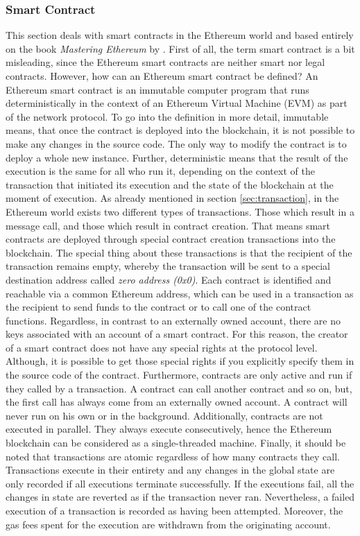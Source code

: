 \subsubsection{Smart Contract}
\label{sec:smart_contract}
This section deals with smart contracts in the Ethereum world and based 
entirely on the book \textit{Mastering Ethereum} by .
First of all, the term smart contract is a bit misleading, since the Ethereum smart contracts 
are neither smart nor legal contracts. However, how can an Ethereum smart contract be defined?
An Ethereum smart contract is an immutable computer program that runs deterministically in the context of an
Ethereum Virtual Machine (EVM) as part of the network protocol. To go into the definition in more detail, 
immutable means, that once the contract is deployed into the blockchain, it is not possible to make any
changes in the source code. The only way to modify the contract is to deploy a whole new instance. 
Further, deterministic means that the result of the execution is the same for all who run it, 
depending on the context of the transaction that initiated its execution and the state of the blockchain
at the moment of execution.
As already mentioned in section \ref{sec:transaction}, in the Ethereum world exists two different types of transactions.
Those which result in a message call, and those which result in contract creation. 
That means smart contracts are deployed through special contract creation transactions into the blockchain. 
The special thing about these transactions is that the recipient of the transaction remains empty, whereby the transaction
will be sent to a special destination address called \textit{zero address (0x0)}. Each contract is identified and reachable via
a common Ethereum address, which can be used in a transaction as the recipient to send funds to the contract or to call 
one of the contract functions. Regardless, in contrast to an externally owned account, there are no keys associated with 
an account of a smart contract. For this reason, the creator of a smart contract does not have any special rights at the 
protocol level. Although, it is possible to get those special rights if you explicitly 
specify them in the source code of the contract.
Furthermore, contracts are only active and run if they called by a transaction. 
A contract can call another contract and so on, but, 
the first call has always come from an externally owned account. 
A contract will never run on his own or in the background. Additionally, contracts are not executed in parallel.
They always execute consecutively, hence the Ethereum blockchain can be considered as a single-threaded machine. 
Finally, it should be noted that transactions are atomic regardless of how many contracts they call. Transactions execute in
their entirety and any changes in the global state are only recorded if all executions terminate successfully. 
If the executions fail, all the changes in state are reverted as if the transaction never ran. Nevertheless, a failed
execution of a transaction is recorded as having been attempted. Moreover, the gas fees spent for the execution are withdrawn
from the originating account.

\clearpage